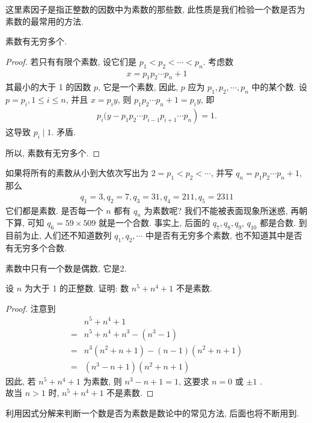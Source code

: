 \begin{note}
	这里素因子是指正整数的因数中为素数的那些数, 此性质是我们检验一个数是否为素数的最常用的方法.
\end{note}

\begin{property}
	素数有无穷多个.
\end{property}
\begin{proof}
	若只有有限个素数, 设它们是 $p_{1}<p_{2}<\cdots<p_{n}$. 考虑数
	\begin{align*}
		x=p_{1} p_{2} \cdots p_{n}+1
	\end{align*}
	其最小的大于 1 的因数 $p$, 它是一个素数, 因此, $p$ 应为 $p_{1}, p_{2}, \cdots, p_{n}$ 中的某个数. 设 $p=p_{i}, 1 \leqslant i \leqslant n$, 并且 $x=p_{i} y$, 则 $p_{1} p_{2} \cdots p_{n}+1=p_{i} y$, 即
  \begin{align*}
    p_{i}(y-\left.p_{1} p_{2} \cdots p_{i-1} p_{i+1} \cdots p_{n}\right)=1.
  \end{align*}
   这导致 $p_{i} \mid 1$. 矛盾.

	所以, 素数有无穷多个.
\end{proof}
\begin{note}
	如果将所有的素数从小到大依次写出为 $2=p_{1}<p_{2}<\cdots$, 并写 $q_{n}=p_{1} p_{2} \cdots p_{n}+1$, 那么
	\begin{align*}
		q_{1}=3, q_{2}=7, q_{3}=31, q_{4}=211, q_{5}=2311
	\end{align*}
	它们都是素数. 是否每一个 $n$ 都有 $q_{n}$ 为素数呢? 我们不能被表面现象所迷惑, 再朝下算, 可知 $q_{6}=59 \times 509$ 就是一个合数. 事实上, 后面的 $q_{7}, q_{8}, q_{9}$, $q_{10}$ 都是合数. 到目前为止, 人们还不知道数列 $q_{1}, q_{2}, \cdots$ 中是否有无穷多个素数, 也不知道其中是否有无穷多个合数.
\end{note}

\begin{property}
	素数中只有一个数是偶数, 它是2.
\end{property}

\begin{example}
	设 $n$ 为大于 1 的正整数. 证明: 数 $n^{5}+n^{4}+1$ 不是素数.
\end{example}
\begin{proof}
	注意到
	\begin{align}
		  & n^{5}+n^{4}+1                                           \\
		= & n^{5}+n^{4}+n^{3}-\left(n^{3}-1\right)                  \\
		= & n^{3}\left(n^{2}+n+1\right)-(n-1)\left(n^{2}+n+1\right) \\
		= & \left(n^{3}-n+1\right)\left(n^{2}+n+1\right)
	\end{align}
	因此, 若 $n^{5}+n^{4}+1$ 为素数, 则 $n^{3}-n+1=1$, 这要求 $n=0$ 或 $\pm 1$ . \\
	故当 $n>1$ 时,  $n^{5}+n^{4}+1$ 不是素数.
\end{proof}
\begin{note}
	利用因式分解来判断一个数是否为素数是数论中的常见方法, 后面也将不断用到.
\end{note}

